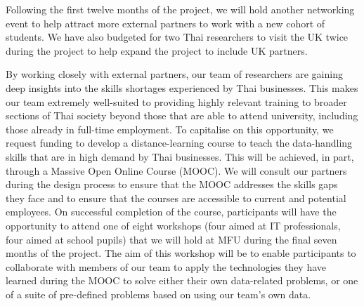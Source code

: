 \documentclass[11pt]{article}
\begin{document}
  Following the first twelve months of the project, we will hold another networking event to help attract more external partners to work with a new cohort of students. We have also budgeted for two Thai researchers to visit the UK twice during the project to help expand the project to include UK partners.
  
  \noindent
  By working closely with external partners, our team of researchers are gaining deep insights into the skills shortages experienced by Thai businesses. This makes our team extremely well-suited to providing highly relevant training to broader sections of Thai society beyond those that are able to attend university, including those already in full-time employment. To capitalise on this opportunity, we request funding to develop a distance-learning course to teach the data-handling skills that are in high demand by Thai businesses. This will be achieved, in part, through a Massive Open Online Course (MOOC). We will consult our partners during the design process to ensure that the MOOC addresses the skills gaps they face and to ensure that the courses are accessible to current and potential employees. On successful completion of the course, participants will have the opportunity to attend one of eight workshops (four aimed at IT professionals, four aimed at school pupils) that we will hold at MFU during the final seven months of the project. The aim of this workshop will be to enable participants to collaborate with members of our team to apply the technologies they have learned during the MOOC to solve either their own data-related problems, or one of a suite of pre-defined problems based on using our team's own data.
      
\end{document}

